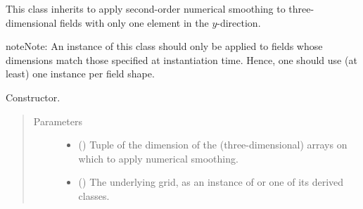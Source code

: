 \documentclass[letterpaper,10pt,english]{sphinxmanual}
\begin{document}

\begin{fulllineitems}
\label{\detokenize{api:dycore.horizontal_smoothing.HorizontalSmoothingSecondOrderXZ}}
This class inherits {\hyperref[\detokenize{api:dycore.horizontal_smoothing.HorizontalSmoothing}]{}} to apply second-order numerical smoothing to
three-dimensional fields with only one element in the \(y\)-direction.

\begin{sphinxadmonition}{note}{Note:}
An instance of this class should only be applied to fields whose dimensions match those specified at instantiation time.
Hence, one should use (at least) one instance per field shape.
\end{sphinxadmonition}

\begin{fulllineitems}
\label{\detokenize{api:dycore.horizontal_smoothing.HorizontalSmoothingSecondOrderXZ.__init__}}
Constructor.
\begin{quote}\begin{description}
\item[{Parameters}] \leavevmode\begin{itemize}
\item {} 
 () \textendash{} Tuple of the dimension of the (three-dimensional) arrays on which to apply numerical smoothing.

\item {} 
 () \textendash{} The underlying grid, as an instance of {\hyperref[\detokenize{api:grids.grid_xyz.GridXYZ}]{}} or one of its derived classes.


\end{itemize}
\end{description}
\end{quote}
\end{fulllineitems}
\end{fulllineitems}
\end{document}
